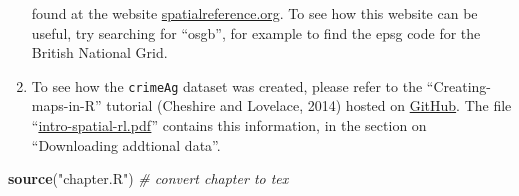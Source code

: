 \documentclass[]{article}
\newenvironment{Shaded}{}{}
\newcommand{\KeywordTok}[1]{\textcolor[rgb]{0.00,0.44,0.13}{\textbf{{#1}}}}
\newcommand{\StringTok}[1]{\textcolor[rgb]{0.25,0.44,0.63}{{#1}}}
\newcommand{\CommentTok}[1]{\textcolor[rgb]{0.38,0.63,0.69}{\textit{{#1}}}}
\newcommand{\NormalTok}[1]{{#1}}
\begin{document}
\begin{enumerate}[1.]
  found at the website
  \href{http://spatialreference.org/}{spatialreference.org}. To see how
  this website can be useful, try searching for ``osgb'', for example to
  find the epsg code for the British National Grid.
\item
  To see how the \texttt{crimeAg} dataset was created, please refer to
  the ``Creating-maps-in-R'' tutorial (Cheshire and Lovelace, 2014)
  hosted on
  \href{https://github.com/Robinlovelace/Creating-maps-in-R}{GitHub}.
  The file
  ``\href{https://github.com/Robinlovelace/Creating-maps-in-R/blob/master/intro-spatial-rl.pdf}{intro-spatial-rl.pdf}''
  contains this information, in the section on ``Downloading addtional
  data''.
\end{enumerate}
\begin{Shaded}
\begin{Highlighting}[]
\KeywordTok{source}\NormalTok{(}\StringTok{"chapter.R"}\NormalTok{)  }\CommentTok{# convert chapter to tex}
\end{Highlighting}
\end{Shaded}
\end{document}
